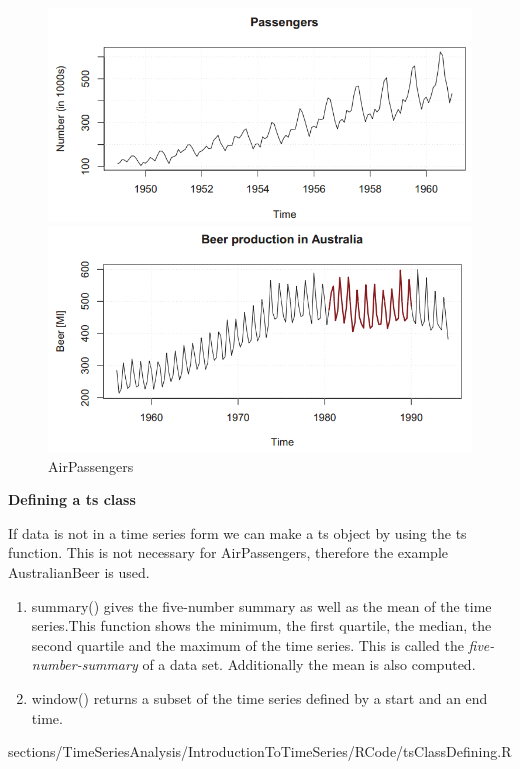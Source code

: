 			\begin{figure}[H]\centering
				\begin{minipage}[c]{0.5\textwidth}
				\includegraphics[width=1\linewidth]{images/tsAirPassengers.png}
					\caption{AirPassengers}
				\end{minipage}\hfill
				\begin{minipage}[c]{0.5\textwidth}
				\includegraphics[width=1\linewidth]{images/tsSeasBehav.png}
				\end{minipage}\hfill
			\end{figure}
			
			\RTheory
			{
				\textbf{Defining a {\color{blue}ts} class}
				
				\vfill
				
				If data is not in a time series form we can make a {\color{blue}ts} object by using the {\color{blue}ts}  function. This is not necessary for AirPassengers, therefore the example AustralianBeer is used.
				
				\begin{enumerate}
					\item  {\color{blue}summary()} gives the five-number summary as well as the mean of the time series.This function shows the minimum, the first quartile, the median, the second quartile and the maximum of the time series. This is called the \textit{five-number-summary} of a data set. Additionally the mean is also computed.
					\item  {\color{blue}window()} returns a subset of the time series defined by a start and an end time.
				\end{enumerate}
			}
			{
				sections/TimeSeriesAnalysis/IntroductionToTimeSeries/RCode/tsClassDefining.R
			}
			
